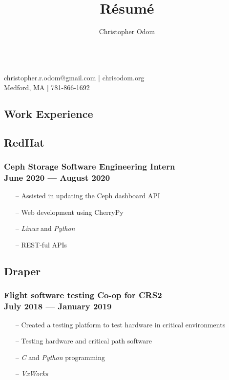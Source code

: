 \documentclass[11pt]{article}
\makeatletter
\renewcommand{\maketitle}
{
	\Huge \noindent \theauthor \\
	\large\noindent christopher.r.odom@gmail.com | chrisodom.org \\
	Medford, MA | 781-866-1692
}
\makeatother
\begin{document}
\setlength\multicolsep{0pt}



\title{R\'esum\'e}
\author{Christopher Odom}

\maketitle

\vspace{1em}

\begin{multicols}{2}

\section{Work Experience}

\subsection{RedHat}
\subsubsection{Ceph Storage Software Engineering Intern\\ June 2020 --- August 2020}
\begin{itemize}[noitemsep, topsep=0pt]
	\item[--] Assisted in updating the Ceph dashboard API
	\item[--] Web development using CherryPy
	\item[--] \emph{Linux} and \emph{Python}
	\item[--] REST-ful APIs
\end{itemize}
\noindent

\subsection{Draper}
\subsubsection{Flight software testing Co-op for CRS2\\ July 2018 --- January 2019}
\begin{itemize}[noitemsep, topsep=0pt]
	\item[--] Created a testing platform to test hardware in critical environments
	\item[--] Testing hardware and critical path software
	\item[--] \emph{C} and \emph{Python} programming
	\item[--] \emph{VxWorks}
\end{itemize}


\end{multicols}
\end{document}
